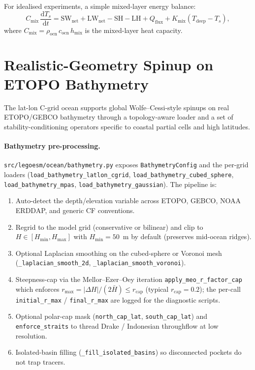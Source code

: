 \documentclass[11pt,twoside]{report}
\newcommand{\dd}{\mathrm{d}}
\begin{document}
For idealised experiments, a simple mixed-layer energy balance:
\begin{equation}
  C_{\mathrm{mix}}\,\frac{\dd T_s}{\dd t}
  = \mathrm{SW}_{\mathrm{net}} + \mathrm{LW}_{\mathrm{net}}
  - \mathrm{SH} - \mathrm{LH}
  + Q_{\mathrm{flux}} + K_{\mathrm{mix}}(T_{\mathrm{deep}}-T_s),
\end{equation}
where $C_{\mathrm{mix}}=\rho_{\mathrm{ocn}}\,c_{\mathrm{ocn}}\,h_{\mathrm{mix}}$
is the mixed-layer heat capacity.


\section{Realistic-Geometry Spinup on ETOPO Bathymetry}
\label{sec:realistic-geometry-ocean}

The lat-lon C-grid ocean supports global Wolfe--Cessi-style spinups on
real ETOPO/GEBCO bathymetry through a topology-aware loader and a set
of stability-conditioning operators specific to coastal partial cells
and high latitudes.

\paragraph{Bathymetry pre-processing.}
\texttt{src/legoesm/ocean/bathymetry.py} exposes
\texttt{BathymetryConfig} and the per-grid loaders
(\texttt{load\_bathymetry\_latlon\_cgrid},
\texttt{load\_bathymetry\_cubed\_sphere},
\texttt{load\_bathymetry\_mpas},
\texttt{load\_bathymetry\_gaussian}).  The pipeline is:
\begin{enumerate}[nosep]
  \item Auto-detect the depth/elevation variable across ETOPO, GEBCO,
        NOAA ERDDAP, and generic CF conventions.
  \item Regrid to the model grid (conservative or bilinear) and clip
        to $H \in [H_{\min}, H_{\max}]$ with $H_{\min} = 50$~m by
        default (preserves mid-ocean ridges).
  \item Optional Laplacian smoothing on the cubed-sphere or
        Voronoi mesh (\texttt{\_laplacian\_smooth\_2d},
        \texttt{\_laplacian\_smooth\_voronoi}).
  \item Steepness-cap via the Mellor--Ezer--Oey iteration
        \texttt{apply\_meo\_r\_factor\_cap} which enforces
        $r_{\max} = |\Delta H|/(2\bar H) \le r_{\mathrm{cap}}$
        (typical $r_{\mathrm{cap}}=0.2$); the per-call
        \texttt{initial\_r\_max} / \texttt{final\_r\_max} are logged
        for the diagnostic scripts.
  \item Optional polar-cap mask (\texttt{north\_cap\_lat},
        \texttt{south\_cap\_lat}) and \texttt{enforce\_straits} to
        thread Drake / Indonesian throughflow at low resolution.
  \item Isolated-basin filling
        (\texttt{\_fill\_isolated\_basins}) so disconnected pockets
        do not trap tracers.
\end{enumerate}
\end{document}
